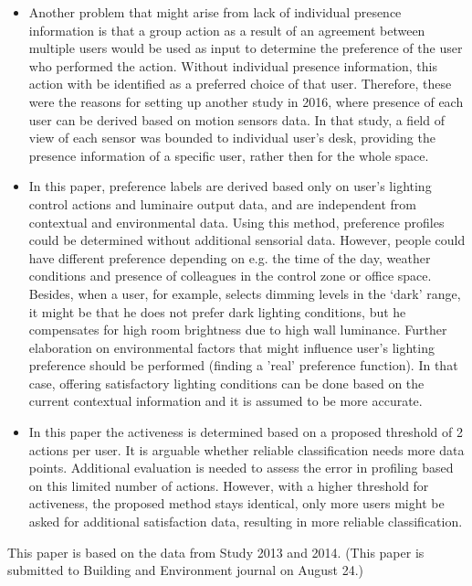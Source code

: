 \documentclass[a4paper]{article}
\begin{document}
\begin{itemize}
\begin{itemize}
	\item Another problem that might arise from lack of individual presence information is that a group action as a result of an agreement between multiple users would be used as input to determine the preference of the user who performed the action. Without individual presence information, this action with be identified as a preferred choice of that user. 
 \color{red} Therefore, these were the reasons for setting up another study in 2016, where presence of each user can be derived based on motion sensors data. In that study, a field of view of each sensor was bounded to individual user's desk, providing the presence information of a specific user, rather then for the whole space. \color{black}
	\item In this paper, preference labels are derived based only on user’s lighting control actions and luminaire output data, and are independent from contextual and environmental data. Using this method, preference profiles could be determined without additional sensorial data. However, people could have different preference depending on e.g. the time of the day, weather conditions and presence of colleagues in the control zone or office space. Besides, when a user, for example, selects dimming levels in the ‘dark’ range, it might be that he does not prefer dark lighting conditions, but he compensates for high room brightness due to high wall luminance. Further elaboration on environmental factors that might influence user’s lighting preference should be performed (finding a 'real' preference function).  In that case, offering satisfactory lighting conditions can be done based on the current contextual information and it is assumed to be more accurate.
	\item In this paper the activeness is determined based on a proposed threshold of 2 actions per user. It is arguable whether reliable classification needs more data points. Additional evaluation is needed to assess the error in profiling based on this limited number of actions. However, with a higher threshold for activeness, the proposed method stays identical, only more users might be asked for additional satisfaction data, resulting in more reliable classification.
	\end{itemize}
\end{itemize}


This paper is based on the data from Study 2013 and 2014.  
 \color{red}(This paper is submitted to Building and Environment journal on August 24.) 
\end{document}

